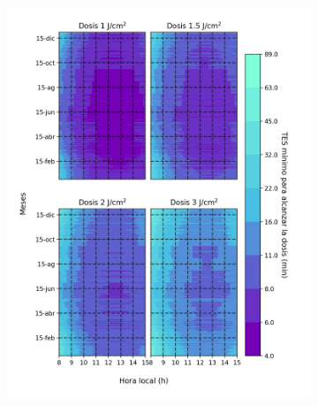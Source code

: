 \documentclass{article}
\begin{document}
\begin{multicols}{2}
\begin{figure}[H]
\begin{subfigure}[H]{0.5\linewidth}
        \includegraphics[scale=0.395]{images/pso.png}
    \end{subfigure}
    \begin{subfigure}[H]{0.4\linewidth}
        \changefontsizes{9pt}
        \caption{}
        \centering
        \vspace{-0.2cm}

\end{subfigure}
\end{figure}
\end{multicols}
\end{document}
